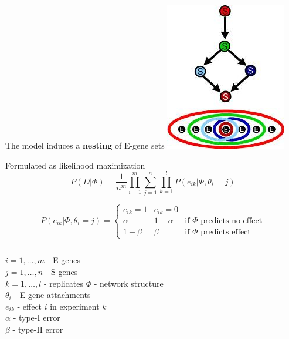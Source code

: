 \documentclass{beamer}
\begin{document}
\begin{frame}{The model induces a \textbf{nesting} of E-gene sets}
\centering
\includegraphics{NestedEffects.jpg}
\end{frame}

\begin{frame}{Formulated as likelihood maximization}
\[ P( D | \Phi ) = \frac{ 1 }{ n^m } \prod_{i=1}^m \sum_{j=1}^n \prod_{k=1}^l P( e_{ik} | \Phi, \theta_i = j ) \]

\[ P( e_{ik} | \Phi, \theta_i = j ) = \left\{
  \begin{array}{ccl}
    e_{ik} = 1 & e_{ik} = 0 \\
    \alpha & 1-\alpha &\text{if } \Phi \text{ predicts no effect} \\
    1-\beta & \beta &\text{if } \Phi \text{ predicts effect}
  \end{array}
 \right.
\]

\scriptsize
\begin{columns}
$i = 1,\ldots,m$ - E-genes \\
$j = 1,\ldots,n$ - S-genes \\
$k = 1, \ldots, l$ - replicates
$\Phi$ - network structure \\
$\theta_i$ - E-gene attachments \\
$e_{ik}$ - effect $i$ in experiment $k$ \\
$\alpha$ - type-I error \\
$\beta$ - type-II error \\
\end{columns}

\vfill

\raggedleft \cite{Markowetz01012005}

\end{frame}
\end{document}
